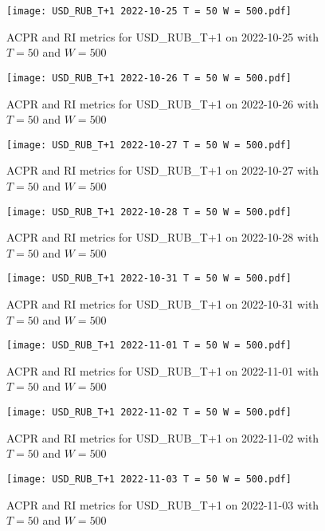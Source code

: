 \begin{figure}[htbp]
	\texttt{[image: USD\_RUB\_T+1 2022-10-25 T = 50 W = 500.pdf]}
	\caption{ACPR and RI metrics for USD\_RUB\_T+1 on 2022-10-25 with $T = 50$ and $W = 500$}
\end{figure}

\begin{figure}[htbp]
	\texttt{[image: USD\_RUB\_T+1 2022-10-26 T = 50 W = 500.pdf]}
	\caption{ACPR and RI metrics for USD\_RUB\_T+1 on 2022-10-26 with $T = 50$ and $W = 500$}
\end{figure}

\begin{figure}[htbp]
	\texttt{[image: USD\_RUB\_T+1 2022-10-27 T = 50 W = 500.pdf]}
	\caption{ACPR and RI metrics for USD\_RUB\_T+1 on 2022-10-27 with $T = 50$ and $W = 500$}
\end{figure}

\begin{figure}[htbp]
	\texttt{[image: USD\_RUB\_T+1 2022-10-28 T = 50 W = 500.pdf]}
	\caption{ACPR and RI metrics for USD\_RUB\_T+1 on 2022-10-28 with $T = 50$ and $W = 500$}
\end{figure}

\begin{figure}[htbp]
	\texttt{[image: USD\_RUB\_T+1 2022-10-31 T = 50 W = 500.pdf]}
	\caption{ACPR and RI metrics for USD\_RUB\_T+1 on 2022-10-31 with $T = 50$ and $W = 500$}
\end{figure}

\begin{figure}[htbp]
	\texttt{[image: USD\_RUB\_T+1 2022-11-01 T = 50 W = 500.pdf]}
	\caption{ACPR and RI metrics for USD\_RUB\_T+1 on 2022-11-01 with $T = 50$ and $W = 500$}
\end{figure}

\begin{figure}[htbp]
	\texttt{[image: USD\_RUB\_T+1 2022-11-02 T = 50 W = 500.pdf]}
	\caption{ACPR and RI metrics for USD\_RUB\_T+1 on 2022-11-02 with $T = 50$ and $W = 500$}
\end{figure}

\begin{figure}[htbp]
	\texttt{[image: USD\_RUB\_T+1 2022-11-03 T = 50 W = 500.pdf]}
	\caption{ACPR and RI metrics for USD\_RUB\_T+1 on 2022-11-03 with $T = 50$ and $W = 500$}
\end{figure}

